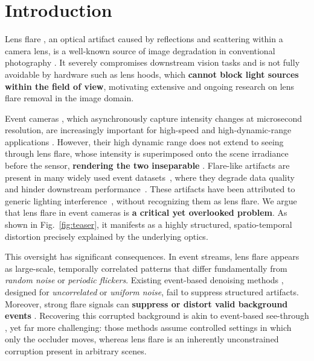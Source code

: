 \section{Introduction}
\label{sec:intro}

Lens flare \cite{fowles1989introduction,hullin2011physically,wu2021train}, an optical artifact caused by reflections and scattering within a camera lens, is a well-known source of image degradation in conventional photography \cite{wu2021train,zhou2023improving,dai2022flare7k,dai2024flare7k++,jiang2024mfdnet}. It severely compromises downstream vision tasks and is not fully avoidable by hardware such as lens hoods, which \textbf{cannot block light sources within the field of view}, motivating extensive and ongoing research on lens flare removal in the image domain. 


Event cameras \cite{gallego2020event,li2021recent,posch2014retinomorphic, chaney2023m3ed,perot2020mpx1,kim2021n-imagenet,muglikar2025event}, which asynchronously capture intensity changes at microsecond resolution, are increasingly important for high-speed and high-dynamic-range applications \cite{tulyakov2022time,hagenaars2021self,li2022asynchronous,lin2024e2pnet,vemprala2021representation,wang2023visevent,zheng2023deep,gehrig2024low,han2024event,li2025active,alonso2019ev-segnet,sun2022ess,kong2024openess,kong2025eventfly,kong2025talk2event,lu2025flexevent,sun2024unified,gehrig2024dense,brander2025reading,messikommer2025data,geckeler2025event}. However, their high dynamic range does not extend to seeing through lens flare, whose intensity is superimposed onto the scene irradiance before the sensor, \textbf{rendering the two inseparable} \cite{brandli2014davis,posch2010gen1,son2017gen3,finateu2020gen4}. Flare-like artifacts are present in many widely used event datasets~\cite{gehrig2021dsec,gehrig2021raft,hu2020ddd20,binas2017ddd17,zhu2018multivehicle}, where they degrade data quality and hinder downstream performance~\cite{shi2023identifying,shi2024polarity,hidalgo2020learning,zubic2023from,jing2024hpl-ess,hamaguchi2023hmnet}. These artifacts have been attributed to generic lighting interference~\cite{shi2023identifying}, without recognizing them as lens flare. We argue that lens flare in event cameras is \textbf{a critical yet overlooked problem}. As shown in Fig.~\ref{fig:teaser}, it manifests as a highly structured, spatio-temporal distortion precisely explained by the underlying optics.


This oversight has significant consequences. In event streams, lens flare appears as large-scale, temporally correlated patterns that differ fundamentally from \emph{random noise} or \emph{periodic flickers}. Existing event-based denoising methods \cite{shi2024polarity,shi2023identifying,wang2022linear,guo2022low,duan2021eventzoom}, designed for \emph{uncorrelated} or \emph{uniform noise}, fail to suppress structured artifacts. Moreover, strong flare signals can \textbf{suppress or distort valid background events} \cite{valencia2023optically}. Recovering this corrupted background is akin to event-based see-through \cite{yu2022learning}, yet far more challenging: those methods assume controlled settings in which only the occluder moves, whereas lens flare is an inherently unconstrained corruption present in arbitrary scenes.


